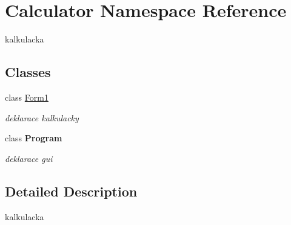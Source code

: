 \hypertarget{namespace_calculator}{}\section{Calculator Namespace Reference}
\label{namespace_calculator}


kalkulacka  


\subsection*{Classes}
\begin{DoxyCompactItemize}
\item 
class \hyperlink{class_calculator_1_1_form1}{Form1}
\begin{DoxyCompactList}\small\item\em deklarace kalkulacky \end{DoxyCompactList}\item 
class {\bfseries Program}
\begin{DoxyCompactList}\small\item\em deklarace gui \end{DoxyCompactList}\end{DoxyCompactItemize}


\subsection{Detailed Description}
kalkulacka 

